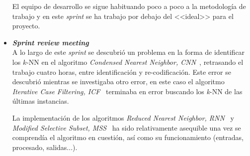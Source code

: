 \begin{itemize}
El equipo de desarrollo se sigue habituando poco a poco a la metodología de trabajo y en este \textit{sprint} se ha trabajo por debajo del <<ideal>> para el proyecto. 

\item \textbf{\textit{Sprint review meeting}}\\
A lo largo de este \textit{sprint} se descubrió un problema en la forma de identificar los $k$-NN en el algoritmo \textit{Condensed Nearest Neighbor, CNN}~\cite{hart1968condensed}, retrasando el trabajo cuatro horas, entre identificación y re-codificación. Este error se descubrió mientras se investigaba otro error, en este caso el algoritmo \textit{Iterative Case Filtering, ICF}~\cite{brighton2002advances} terminaba en error buscando los \textit{k}-NN de las últimas instancias.

La implementación de los algoritmos \textit{Reduced Nearest Neighbor, RNN}~\cite{gates1972reduced} y \textit{Modified Selective Subset, MSS}~\cite{barandela2005decision} ha sido relativamente asequible una vez se comprendía el algoritmo en cuestión, así como su funcionamiento (entradas, procesado, salidas...).
\end{itemize}

